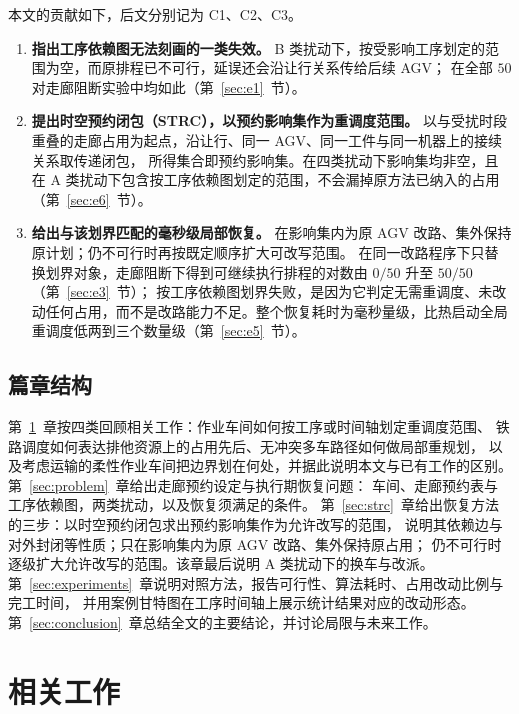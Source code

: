 \documentclass[manuscript,screen,review]{acmart}
\providecommand{\STRC}{\textsc{STRC}}
\newcommand{\NPairs}{50}
\newcommand{\FeasRone}{0/\NPairs}            %
\newcommand{\FeasRtwo}{\NPairs/\NPairs}      %
\begin{document}
本文的贡献如下，后文分别记为 C1、C2、C3。
\begin{enumerate}[label=\textbf{C\arabic*.},leftmargin=2.2em,itemsep=0.4em]
\item \textbf{指出工序依赖图无法刻画的一类失效。}
B 类扰动下，按受影响工序划定的范围为空，而原排程已不可行，延误还会沿让行关系传给后续 AGV；
在全部 \(\NPairs\) 对走廊阻断实验中均如此（第~\ref{sec:e1}~节）。

\item \textbf{提出时空预约闭包（\STRC），以预约影响集作为重调度范围。}
以与受扰时段重叠的走廊占用为起点，沿让行、同一 AGV、同一工件与同一机器上的接续关系取传递闭包，
所得集合即预约影响集。在四类扰动下影响集均非空，且在 A 类扰动下包含按工序依赖图划定的范围，不会漏掉原方法已纳入的占用（第~\ref{sec:e6}~节）。

\item \textbf{给出与该划界匹配的毫秒级局部恢复。}
在影响集内为原 AGV 改路、集外保持原计划；仍不可行时再按既定顺序扩大可改写范围。
在同一改路程序下只替换划界对象，走廊阻断下得到可继续执行排程的对数由 \(\FeasRone\) 升至 \(\FeasRtwo\)（第~\ref{sec:e3}~节）；
按工序依赖图划界失败，是因为它判定无需重调度、未改动任何占用，而不是改路能力不足。整个恢复耗时为毫秒量级，比热启动全局重调度低两到三个数量级（第~\ref{sec:e5}~节）。
\end{enumerate}

\subsection{篇章结构}

第~\ref{sec:related_work}~章按四类回顾相关工作：作业车间如何按工序或时间轴划定重调度范围、
铁路调度如何表达排他资源上的占用先后、无冲突多车路径如何做局部重规划，
以及考虑运输的柔性作业车间把边界划在何处，并据此说明本文与已有工作的区别。
第~\ref{sec:problem}~章给出走廊预约设定与执行期恢复问题：
车间、走廊预约表与工序依赖图，两类扰动，以及恢复须满足的条件。
第~\ref{sec:strc}~章给出恢复方法的三步：以时空预约闭包求出预约影响集作为允许改写的范围，
说明其依赖边与对外封闭等性质；只在影响集内为原 AGV 改路、集外保持原占用；
仍不可行时逐级扩大允许改写的范围。该章最后说明 A 类扰动下的换车与改派。
第~\ref{sec:experiments}~章说明对照方法，报告可行性、算法耗时、占用改动比例与完工时间，
并用案例甘特图在工序时间轴上展示统计结果对应的改动形态。
第~\ref{sec:conclusion}~章总结全文的主要结论，并讨论局限与未来工作。

\section{相关工作}
\label{sec:related_work}
\end{document}
